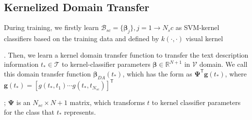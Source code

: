 \subsection{Kernelized Domain Transfer}
\label{ss:tr}
During training, we firstly learn $\mathcal{B}_{sc} = \{ \boldsymbol{\beta}_j \}, j=1\to N_sc$ as SVM-kernel classifiers based on  the training data and defined by $k(\cdot, \cdot)$ visual kernel. Then, we learn a kernel domain transfer function to transfer the text description information ${t_*} \in \mathcal{T}$ to kernel-classifier parameters $\boldsymbol{\beta} \in \mathbb{R}^{N+1}$ in $\mathcal{V}$ domain. We call this domain transfer function $\boldsymbol{\beta}_{DA}(t_*)$, which has the form as ${\mathbf{\Psi}}^\textsf{T} {\textbf{g}(t_*)}$, where $\textbf{g}(t_*)  = [g({t_*}, {t}_1) \cdots g({t_*}, {t}_{N_{sc}})]^\textsf{T}$; $\mathbf{\Psi}$ is an $N_{sc}  \times {N+1}$ matrix, which transforms ${t}$ to  kernel classifier parameters for the class that ${t_*}$ represents.  



